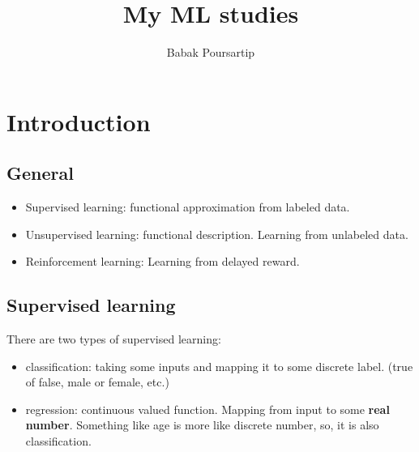 \documentclass[12pt]{report}
\author{Babak Poursartip}
\title{My ML studies}
\begin{document}
\justifying


\maketitle



\tableofcontents                  %

%
\chapter[Introduction]{Introduction}
\label{ch:ML}
\noindent

\section{General}

\begin{itemize}
	\item Supervised learning: functional approximation from labeled data. 
	\item Unsupervised learning: functional description. Learning from unlabeled data. 
	\item Reinforcement learning: Learning from delayed reward. 
\end{itemize}


\section{Supervised learning}
\label{sec:sl}
There are two types of supervised learning:

\begin{itemize}
\item classification: taking some inputs and mapping it to some discrete label. (true of false, male or female, etc.)
\item regression: continuous valued function. Mapping from input to some \textbf{real number}. Something like age is more like discrete number, so, it is also classification. 
\end{itemize}
\end{document}
